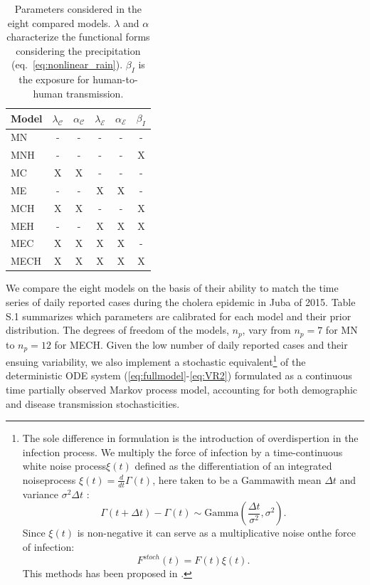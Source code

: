 \begin{table}[h!]
\centering
\begin{tabular}{lccccc}
\toprule
     Model       & $\lambda_{\mathcal{C}}$ & $\alpha_\mathcal{C}$ & $\lambda_{\mathcal{E}}$ & $\alpha_\mathcal{E}$ & $\beta_I$   \\
    \hline
    \textsc{MN} &       -    &    -   &       -      &       -      &  - \\
    \textsc{MNH} &     -      &   -    &    -         &        -     &   X\\
    \textsc{MC} &       X   &   X   &     -        &       -      &  - \\
    \textsc{ME} &         -  &   -    &       X     &    X         & -  \\
    \textsc{MCH}&       X   &   X   &      -       &     -        & X  \\
    \textsc{MEH}&        -   &  -     &       X     &    X         & X  \\
    \textsc{MEC}&       X  &   X   &       X     &     X       & -\\
    \textsc{MECH}&       X  &   X   &       X     &     X        &   X\\
\bottomrule
\end{tabular}
\caption{Parameters considered in the eight compared models.  $\lambda$ and $\alpha$ characterize the functional forms considering the precipitation (eq.~\ref{eq:nonlinear_rain}). $\beta_I$ is the exposure for human-to-human transmission.}
\label{tab:models}
\end{table}

We compare the eight models on the basis of their ability to match the time series of daily reported cases during the cholera epidemic in Juba of 2015. Table S.1 summarizes which parameters are calibrated for each model and their prior distribution. The degrees of freedom of the models, $n_p$, vary from $n_p=7$ for \textsc{MN} to $n_p=12$ for \textsc{MECH}. Given the low number of daily reported cases and their ensuing variability, we also implement a stochastic equivalent\footnote[][-5\baselineskip]{The sole difference in formulation is the introduction of overdispertion in the infection process. We multiply the force of infection by a time-continuous white noise process\(\xi(t)\) defined as the differentiation of an integrated noiseprocess \(\xi(t) = \frac{d}{dt}\Gamma(t)\), here taken to be a Gammawith mean \(\Delta t\) and variance \(\sigma^2 \Delta t\) : \[
\Gamma (t+\Delta t) - \Gamma (t) \sim \text{Gamma}\left( \frac{\Delta t}{\sigma^2}, \sigma^2\right). \]
Since \(\xi(t)\) is non-negative it can serve as a multiplicative noise onthe force of infection: \[ F^{stoch}(t) = F(t) \xi(t). \]This methods has been proposed in .} of the deterministic ODE system (\ref{eq:fullmodel}-\ref{eq:VR2}) formulated as a continuous time partially observed Markov process model, accounting for both demographic and disease transmission stochasticities\cite{Breto:TimeSeriesAnalysis:2009}. 

